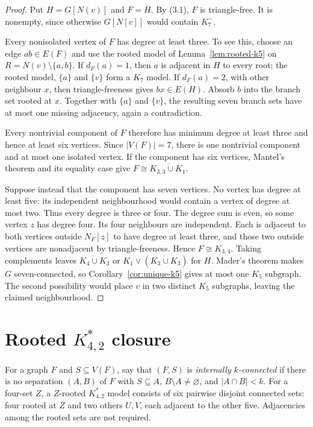 \documentclass[11pt]{amsart}
\newcommand{\N}{N}
\begin{document}
\begin{proof}
Put $H=G[\N(v)]$ and $F=\overline H$.  By (3.1), $F$ is triangle-free.
It is nonempty, since otherwise $G[\N[v]]$ would contain $K_7^{-}$.

Every nonisolated vertex of $F$ has degree at least three.  To see this,
choose an edge $ab\in E(F)$ and use the rooted model of
Lemma~\ref{lem:rooted-k5} on $R=\N(v)\setminus\{a,b\}$.  If $d_F(a)=1$,
then $a$ is adjacent in $H$ to every root; the rooted model, $\{a\}$ and
$\{v\}$ form a $K_7$ model.  If $d_F(a)=2$, with other neighbour $x$,
then triangle-freeness gives $bx\in E(H)$.  Absorb $b$ into the branch set
rooted at $x$.  Together with $\{a\}$ and $\{v\}$, the resulting seven
branch sets have at most one missing adjacency, again a contradiction.

Every nontrivial component of $F$ therefore has minimum degree at least
three and hence at least six vertices.  Since $|V(F)|=7$, there is one
nontrivial component and at most one isolated vertex.  If the component
has six vertices, Mantel's theorem and its equality case give
$F\cong K_{3,3}\mathbin{\dot\cup}K_1$.

Suppose instead that the component has seven vertices.  No vertex has
degree at least five: its independent neighbourhood would contain a
vertex of degree at most two.  Thus every degree is three or four.  The
degree sum is even, so some vertex $z$ has degree four.  Its four
neighbours are independent.  Each is adjacent to both vertices outside
$\N_F[z]$ to have degree at least three, and those two outside vertices
are nonadjacent by triangle-freeness.  Hence $F\cong K_{3,4}$.  Taking
complements leaves $K_4\mathbin{\dot\cup}K_3$ or
$K_1\vee(K_3\mathbin{\dot\cup}K_3)$ for $H$.  Mader's theorem makes $G$
seven-connected, so Corollary~\ref{cor:unique-k5} gives at most one $K_5$
subgraph.  The second possibility would place $v$ in two distinct $K_5$
subgraphs, leaving the claimed neighbourhood.
\end{proof}

\section[Rooted model closure]{Rooted
\texorpdfstring{$K^*_{4,2}$}{K-star(4,2)} closure}

For a graph $F$ and $S\subseteq V(F)$, say that $(F,S)$ is
\emph{internally $k$-connected} if there is no separation $(A,B)$ of $F$
with $S\subseteq A$, $B\setminus A\ne\varnothing$, and
$|A\cap B|<k$.  For a four-set $Z$, a $Z$-rooted $K^*_{4,2}$ model
consists of six pairwise disjoint connected sets: four rooted at $Z$ and
two others $U,V$, each adjacent to the other five.  Adjacencies among the
rooted sets are not required.
\end{document}
